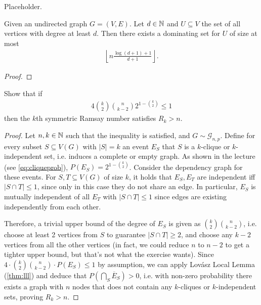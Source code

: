 \begin{aufgabe}
	Placeholder.
\end{aufgabe}
\begin{aufgabe}
	Given an undirected graph $G=(V,E)$.
	Let $d \in \mathbb{N}$ and $U \subseteq V$ the set of all vertices with degree at least $d$.
	Then there exists a dominating set for $U$ of size at most 
	\begin{align*}
		\left\lfloor n \frac{\log(d+1)+1}{d+1} \right\rfloor.
	\end{align*}
	\begin{proof}
		
	\end{proof}
\end{aufgabe}
\begin{aufgabe}
	Show that if
	\begin{align*}
		4 \binom{k}{2}\binom{n}{k-2}2^{1-\binom{k}{2}} \leq 1
	\end{align*}
	then the $k$th symmetric Ramsay number satisfies $R_k > n$.
	
	\begin{proof}	
	Let $n,k \in \mathbb{N}$ such that the inequality is satisfied, and $G \sim \mathcal{G}_{n,p}$.
	Define for every subset $S \subseteq V(G)$ with $|S|=k$ an event $E_S$ that $S$ is a $k$-clique or $k$-independent set, i.e. induces a complete or empty graph.
	As shown in the lecture (see \eqref{eq:cliqueprob}), $P(E_S) = 2^{1-\binom{k}{2}}$.  
	Consider the dependency graph for these events.
	For $S,T \subseteq V(G)$ of size $k$, it holds that $E_S,E_T$ are independent iff $|S\cap T| \leq 1$,
	since only in this case they do not share an edge.
	In particular, $E_S$ is mutually independent of all $E_T$ with $|S \cap T| \leq 1$ since edges are existing independently from each other.
	
	Therefore, a trivial upper bound of the degree of $E_S$ is given as $\binom{k}{2}\binom{n}{k-2}$,
	i.e. choose at least 2 vertices from $S$ to guarantee $|S \cap T| \geq 2$, and choose any $k-2$ vertices from all the other vertices 
	(in fact, we could reduce $n$ to $n-2$ to get a tighter upper bound, but that's not what the exercise wants).
	Since $4 \cdot \binom{k}{2}\binom{n}{k-2} \cdot P(E_S) \leq 1$ by assumption, 
	we can apply Lovász Local Lemma (\autoref{thm:lll}) and deduce that $P(\bigcap_S \overline{E}_S) > 0$,
	i.e. with non-zero probability there exists a graph with $n$ nodes that does not contain any $k$-cliques or $k$-independent sets,
	proving $R_k > n$. 
\end{proof}
\end{aufgabe}
